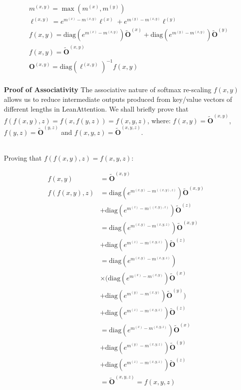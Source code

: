 \begin{align*}
  & m^{(x,y)} = \max(m^{(x)}, m^{(y)}) \\
  & \ell^{(x,y)} = e^{m^{(x)} - m^{(x,y)}} \ell^{(x)} + e^{m^{(y)} - m^{(x,y)}} \ell^{(y)} \\
  & f(x,y) = \mathrm{diag}(e^{m^{(x)} - m^{(x,y)}}){\tilde{\mathbf{O}}}^{(x)} + \mathrm{diag}(e^{m^{(y)} - m^{(x,y)}}){\tilde{\mathbf{O}}}^{(y)} \\
  & f(x,y) = {\tilde{\mathbf{O}}}^{(x,y)} \\
  & \mathbf{O}^{(x,y)} = \mathrm{diag}(\ell^{(x,y)})^{-1}{f(x,y)} \\
\end{align*}

{\textbf{Proof of Associativity}} The associative nature of softmax re-scaling $f(x,y)$ allows us to reduce intermediate outputs produced from key/value vectors of different lengths in LeanAttention. We shall briefly prove that $f(f(x,y), z) = f(x, f(y,z)) = f(x,y,z)$, where: $f(x,y) = {\tilde{\mathbf{O}}}^{(x,y)}$, $f(y,z) = {\tilde{\mathbf{O}}}^{(y,z)}$ and $f(x,y,z) = {\tilde{\mathbf{O}}}^{(x,y,z)}$. 

 \\

Proving that $f(f(x,y), z) = f(x,y,z)$:
\begingroup
\allowdisplaybreaks

\begin{align*}
 f(x,y) &= {\tilde{\mathbf{O}}}^{(x,y)} \\
f(f(x,y), z) &= \mathrm{diag}(e^{m^{(x,y)} - m^{((x,y),z)}}){\tilde{\mathbf{O}}}^{(x,y)} \\
&+ \mathrm{diag}(e^{m^{(z)} - m^{((x,y),z)}}){\tilde{\mathbf{O}}}^{(z)} \\
&= \mathrm{diag}(e^{m^{(x,y)} - m^{(x,y,z)}}){\tilde{\mathbf{O}}}^{(x,y)} \\
&+ \mathrm{diag}(e^{m^{(z)} - m^{(x,y,z)}}){\tilde{\mathbf{O}}}^{(z)} \\
&= \mathrm{diag}(e^{m^{(x,y)} - m^{(x,y,z)}}) \\
& \times (\mathrm{diag}(e^{m^{(x)} - m^{(x,y)}}){\tilde{\mathbf{O}}}^{(x)} \\
& + \mathrm{diag}(e^{m^{(y)} - m^{(x,y)}}){\tilde{\mathbf{O}}}^{(y)}) \\
& + \mathrm{diag}(e^{m^{(z)} - m^{(x,y,z)}}){\tilde{\mathbf{O}}}^{(z)} \\
&= \mathrm{diag}(e^{m^{(x)} - m^{(x,y,z)}}){\tilde{\mathbf{O}}}^{(x)} \\
& + \mathrm{diag}(e^{m^{(y)} - m^{(x,y,z)}}){\tilde{\mathbf{O}}}^{(y)} \\
& + \mathrm{diag}(e^{m^{(z)} - m^{(x,y,z)}}){\tilde{\mathbf{O}}}^{(z)} \\
&= {\tilde{\mathbf{O}}}^{(x,y,z)} = f(x,y,z)\\
\end{align*}

